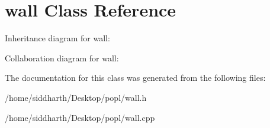 \hypertarget{classwall}{}\section{wall Class Reference}
\label{classwall}


Inheritance diagram for wall\+:


Collaboration diagram for wall\+:


The documentation for this class was generated from the following files\+:\begin{DoxyCompactItemize}
\item 
/home/siddharth/\+Desktop/popl/wall.\+h\item 
/home/siddharth/\+Desktop/popl/wall.\+cpp\end{DoxyCompactItemize}
